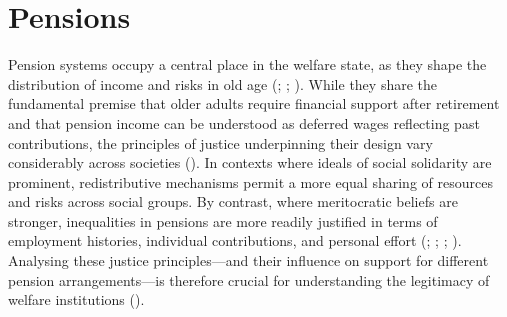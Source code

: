 \documentclass[
  12pt,
]{article}
\begin{document}
\section{Pensions}\label{pensions}

Pension systems occupy a central place in the welfare state, as they
shape the distribution of income and risks in old age
(;
;
). While
they share the fundamental premise that older adults require financial
support after retirement and that pension income can be understood as
deferred wages reflecting past contributions, the principles of justice
underpinning their design vary considerably across societies
(). In
contexts where ideals of social solidarity are prominent, redistributive
mechanisms permit a more equal sharing of resources and risks across
social groups. By contrast, where meritocratic beliefs are stronger,
inequalities in pensions are more readily justified in terms of
employment histories, individual contributions, and personal effort
(;
;
;
).
Analysing these justice principles---and their influence on support for
different pension arrangements---is therefore crucial for understanding
the legitimacy of welfare institutions
().
\end{document}
